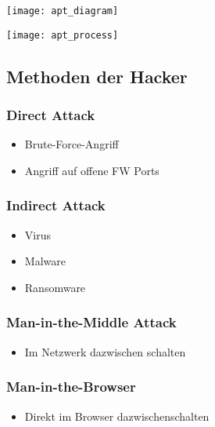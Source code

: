 \begin{center}
    \vspace{-8pt}
    \texttt{[image: apt\_diagram]}
    \vspace{-8pt}
\end{center}
\begin{center}
    \vspace{-8pt}
    \texttt{[image: apt\_process]}
    \vspace{-8pt}
\end{center}

\subsection{Methoden der Hacker}\label{subsec:methoden-der-hacker}

\subsubsection{Direct Attack}
\begin{itemize}
    \item Brute-Force-Angriff
    \item Angriff auf offene FW Ports
\end{itemize}

\subsubsection{Indirect Attack}
\begin{itemize}
    \item Virus
    \item Malware
    \item Ransomware
\end{itemize}

\subsubsection{Man-in-the-Middle Attack}
\begin{itemize}
    \item Im Netzwerk dazwischen schalten
\end{itemize}

\subsubsection{Man-in-the-Browser}
\begin{itemize}
    \item Direkt im Browser dazwischenschalten
\end{itemize}


